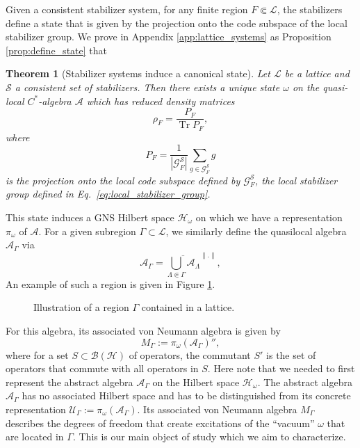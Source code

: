 \documentclass[aps,pra,reprint,superscriptaddress]{revtex4-2}
\newcommand{\cA}{{\mathcal A}}
\newcommand{\cB}{{\mathcal B}}
\newcommand{\cG}{{\mathcal G}}
\newcommand{\cH}{{\mathcal H}}
\newcommand{\cL}{{\mathcal L}}
\newcommand{\cS}{{\mathcal S}}
\newcommand{\cU}{{\mathcal U}}
\newcommand\G{\Gamma}
\renewcommand\L{\Lambda}
\newcommand\w{\omega}
\newcommand\x{\xi}
\newcommand\y{\psi}
\providecommand{\norm}[1]{\lVert #1\rVert}
\newtheorem{theorem}{Theorem}
\theoremstyle{definition}
\theoremstyle{remark}
\begin{document}
Given a consistent stabilizer system, for any finite region $F \Subset \cL$, the stabilizers define a state that is given by the projection onto the code subspace of the local stabilizer group. We prove in Appendix \ref{app:lattice_systems} as Proposition \ref{prop:define_state} that 
\begin{theorem}[Stabilizer systems induce a canonical state]
    Let $\cL$ be a lattice and $\cS$ a consistent set of stabilizers. Then there exists a unique state $\w$ on the quasi-local $C^\ast$-algebra $\cA$ which has reduced density matrices 
    \begin{equation}
        \rho_F = \frac{P_F}{\operatorname{Tr}P_F},
    \end{equation}
    where 
    \begin{equation}
        P_F = \frac{1}{|\cG^{\cS}_F|}\sum_{g \in \cG^{\cS}_F} g
    \end{equation}
    is the projection onto the local code subspace defined by $\cG^{\cS}_F$, the local stabilizer group defined in Eq.~\eqref{eq:local_stabilizer_group}. 
\end{theorem}
This state induces a GNS Hilbert
space $\cH_\w$ \cite{Blackadar} on which we have a representation $\pi_\w$ of $\cA$. For a given
subregion $\G \subset \cL$, we similarly define the quasilocal algebra
$\cA_\G$ via
\begin{equation}
    \cA_\G = \overline{\bigcup_{\L \Subset \G} \cA_\L}^{\norm{.}},
\end{equation}
An example of such a region is given in Figure \ref{fig:subregion}.
\begin{figure}[ht]
    \caption{Illustration of a region $\G$ contained in a lattice.}
    \label{fig:subregion}
\end{figure}

For this algebra, its associated von Neumann algebra is given by
\begin{equation}
    M_{\G}:=\pi_\omega\!\left(\cA_\G\right)'',
\end{equation}
where for a set $S \subset \cB(\cH)$ of operators, the commutant $S'$ is the set of operators that commute with all operators in $S$. Here note that we needed to first represent the abstract algebra $\cA_\G$ on the Hilbert space $\cH_\w$. The abstract algebra $\cA_\G$ has no associated Hilbert space and has to be distinguished from its concrete representation $\cU_\G := \pi_\w(\cA_\G)$.
Its associated von Neumann algebra $M_\G$ describes the degrees of freedom that create excitations of the ``vacuum'' $\w$ that are located in $\G$. This is our main object of study which we aim to characterize.
\end{document}
